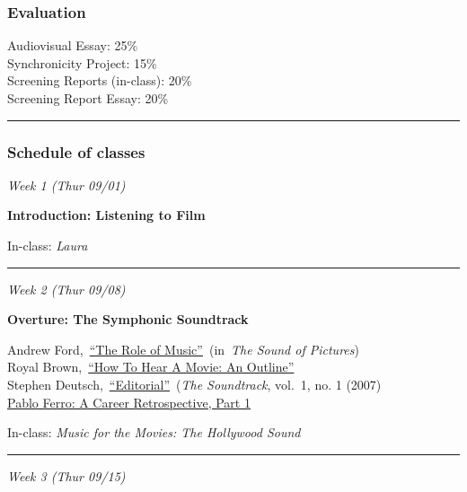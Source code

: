 \documentclass[]{tufte-handout}
\begin{document}
\hypertarget{evaluation}{%
\subsubsection{Evaluation}\label{evaluation}}

Audiovisual Essay: 25\%\\
Synchronicity Project: 15\%\\
Screening Reports (in-class): 20\%\\
Screening Report Essay: 20\%

\begin{center}\rule{0.5\linewidth}{0.5pt}\end{center}

\hypertarget{schedule-of-classes}{%
\subsubsection{Schedule of classes}\label{schedule-of-classes}}

\emph{Week 1 (Thur 09/01)}

\textbf{Introduction: Listening to Film}

In-class: \emph{Laura}

\begin{center}\rule{0.5\linewidth}{0.5pt}\end{center}

\emph{Week 2 (Thur 09/08)}

\textbf{Overture: The Symphonic Soundtrack}

Andrew
Ford,~\href{http://dokoissho.sdf.org/ksc-call/soundtracks/pdf/role-music.pdf}{``The
Role of Music''}~(in~\emph{The Sound of Pictures})\\
Royal
Brown,~\href{http://dokoissho.sdf.org/ksc-call/soundtracks/pdf/brown-hear-movie.pdf}{``How
To Hear A Movie: An Outline''}\\
Stephen
Deutsch,~\href{http://dokoissho.sdf.org/ksc-call/soundtracks/pdf/soundtrack-editorial.pdf}{``Editorial''}~(\emph{The
Soundtrack}, vol.~1, no. 1 (2007)\\
\href{https://www.artofthetitle.com/feature/pablo-ferro-a-career-retrospective-part-1/}{Pablo
Ferro: A Career Retrospective, Part 1}

In-class: \emph{Music for the Movies: The Hollywood Sound}

\begin{center}\rule{0.5\linewidth}{0.5pt}\end{center}

\emph{Week 3 (Thur 09/15)}
\end{document}
